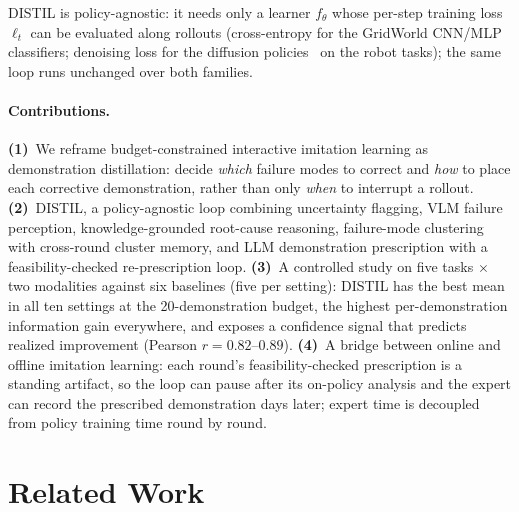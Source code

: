 \documentclass[letterpaper]{article} %
\begin{document}
DISTIL is policy-agnostic: it needs only a learner $f_\theta$ whose
per-step training loss $\ell_t$ can be evaluated along rollouts
(cross-entropy for the GridWorld CNN/MLP classifiers; denoising loss for
the diffusion policies~\citep{chi2023diffusionpolicy} on the robot tasks);
the same loop runs unchanged over both families.

\paragraph{Contributions.}
\textbf{(1)}~We reframe budget-constrained interactive imitation learning as
demonstration distillation: decide \emph{which} failure modes to correct and
\emph{how} to place each corrective demonstration, rather than only
\emph{when} to interrupt a rollout.
\textbf{(2)}~DISTIL, a policy-agnostic loop combining uncertainty flagging,
VLM failure perception, knowledge-grounded root-cause reasoning,
failure-mode clustering with cross-round cluster memory, and LLM
demonstration prescription with a feasibility-checked re-prescription loop.
\textbf{(3)}~A controlled study on five tasks $\times$ two modalities against
six baselines (five per setting): DISTIL has the best mean in all ten settings at the
20-demonstration budget, the highest per-demonstration information gain everywhere,
and exposes a confidence signal that predicts realized improvement
(Pearson $r=0.82$--$0.89$).
\textbf{(4)}~A bridge between online and offline imitation learning:
each round's feasibility-checked prescription is a standing artifact, so the
loop can pause after its on-policy analysis and the expert can record the
prescribed demonstration days later; expert time is decoupled from policy
training time round by round.

\section{Related Work}
\label{sec:related}
\end{document}
